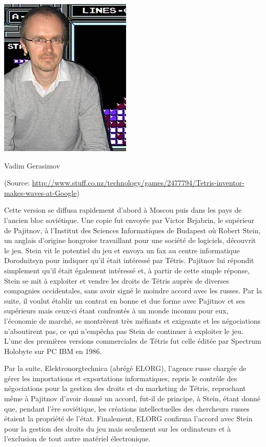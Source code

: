 \begin{center}
	\includegraphics[scale=0.7]{media/Gerasimov.jpg}
	
	Vadim Gerasimov
	
	(Source:   \url{http://www.stuff.co.nz/technology/games/2477794/Tetris-inventor-makes-waves-at-Google})
\end{center}

Cette version se diffusa rapidement d'abord à Moscou puis dans les pays de l'ancien bloc soviétique. Une copie fut envoyée par Victor Brjabrin, le supérieur de Pajitnov, à l'Institut des Sciences Informatiques de Budapest où Robert Stein, un anglais d'origine hongroise travaillant pour une société de logiciels, découvrit le jeu. Stein vit le potentiel du jeu et envoya un fax au centre informatique Dorodnitsyn pour indiquer qu'il était intéressé par Tétris. Pajitnov lui répondit simplement qu'il était également intéressé et, à partir de cette simple réponse, Stein se mit à exploiter et vendre les droits de Tétris auprès de diverses compagnies occidentales, sans avoir signé le moindre accord avec les russes. Par la suite, il voulut établir un contrat en bonne et due forme avec Pajitnov et ses supérieurs mais ceux-ci étant confrontés à un monde inconnu pour eux, l'économie de marché, se montrèrent très méfiants et exigeants et les négociations n'aboutirent pas, ce qui n'empêcha pas Stein de continuer à exploiter le jeu. L'une des premières versions commerciales de Tétris fut celle éditée par Spectrum  Holobyte sur PC IBM en 1986. 

Par la suite, Elektronorgtechnica (abrégé ELORG), l'agence russe chargée de gérer les importations et exportations informatiques, repris le contrôle des négociations pour la gestion des droits et du marketing de Tétris, reprochant même à Pajitnov d'avoir donné un accord, fut-il de principe, à Stein, étant donné que, pendant l'ère soviétique, les créations intellectuelles des chercheurs russes étaient la propriété de l'état. Finalement, ELORG confirma l'accord avec Stein pour la gestion des droits du jeu mais seulement sur les ordinateurs et à l'exclusion de tout autre matériel électronique. 

